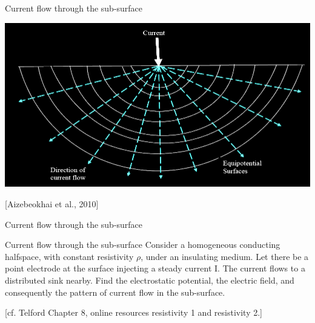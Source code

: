 \begin{frame}{Current flow through the sub-surface}
    \begin{center}
     \includegraphics[width=0.7\linewidth]{Figures/Resistivity/OneElectrodeHomoHalfspace_Aizebeokhai_SResanEss2010.png}
 
     \tiny[Aizebeokhai et al., 2010]
   \end{center}
 \end{frame}


 \begin{frame}{Current flow through the sub-surface}
  \begin{PointSix}{Current flow through the sub-surface}
    \small
    Consider a homogeneous conducting halfspace, with constant resistivity $\rho$, under an insulating medium. Let there be a point electrode at the surface
injecting a steady current I. The current flows to a distributed \alert{sink nearby}. Find the electrostatic potential, the electric field, and consequently the pattern of current flow in the sub-surface.

    [cf. Telford Chapter 8, online resources resistivity 1 and resistivity 2.]
  \end{PointSix}
\end{frame}


